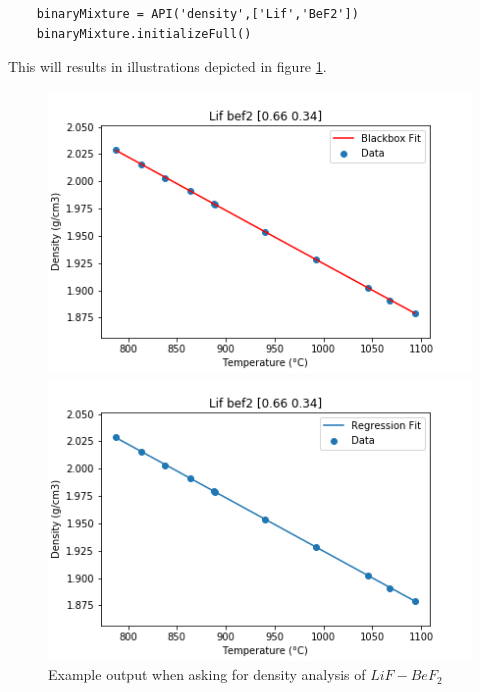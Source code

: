 \begin{verbatim}
    binaryMixture = API('density',['Lif','BeF2'])
    binaryMixture.initializeFull()
\end{verbatim}
This will results in illustrations depicted in figure \ref{fig:lifbef}.

\begin{figure}[h]
\centering
\begin{minipage}{0.5\textwidth}
  \centering
  \includegraphics[width=\linewidth]{msdf/figures/lifbefRe.png}
\end{minipage}%
\begin{minipage}{0.5\textwidth}
  \centering
  \includegraphics[width=\linewidth]{msdf/figures/lifbefBl.png}
\end{minipage}
\caption{Example output when asking for density analysis of $LiF-BeF_2$}
\label{fig:lifbef}
\end{figure}
\newpage